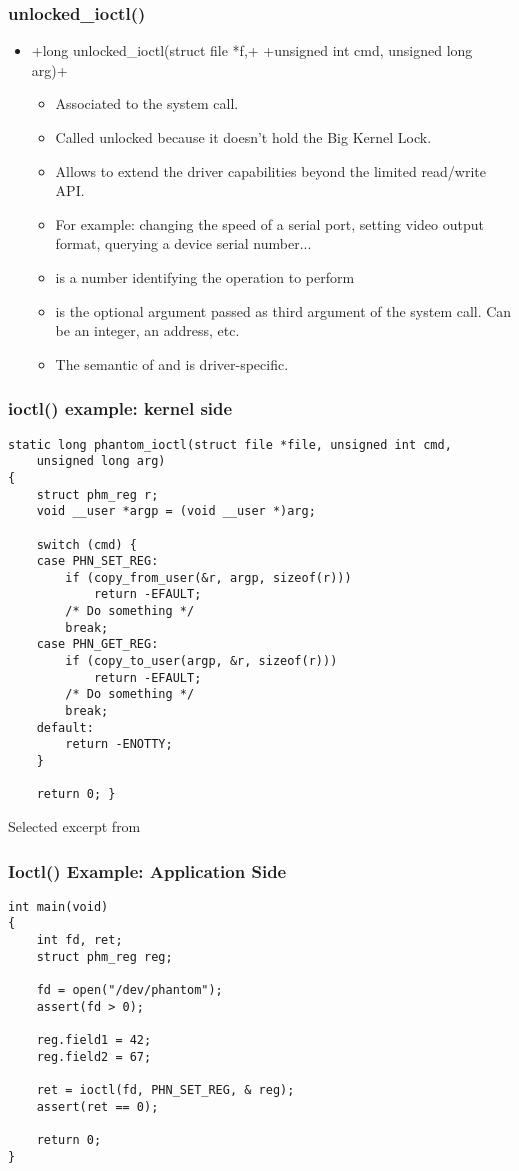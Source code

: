 \begin{frame}[fragile]
  \frametitle{unlocked\_ioctl()}
  \begin{itemize}
  \item {}+long unlocked_ioctl(struct file *f,+
    +unsigned int cmd, unsigned long arg)+
    \begin{itemize}
    \item Associated to the  system call.
    \item Called unlocked because it doesn't hold the Big Kernel Lock.
    \item Allows to extend the driver capabilities beyond the limited
      read/write API.
    \item For example: changing the speed of a serial port, setting
      video output format, querying a device serial number...
    \item {} is a number identifying the operation to perform
    \item {} is the optional argument passed as third argument
      of the  system call. Can be an integer, an
      address, etc.
    \item The semantic of  and  is
      driver-specific.
    \end{itemize}
  \end{itemize}
\end{frame}

\begin{frame}[fragile]
  \frametitle{ioctl() example: kernel side}
\begin{verbatim}
static long phantom_ioctl(struct file *file, unsigned int cmd,
    unsigned long arg)
{
    struct phm_reg r;
    void __user *argp = (void __user *)arg;

    switch (cmd) {
    case PHN_SET_REG:
        if (copy_from_user(&r, argp, sizeof(r)))
            return -EFAULT;
        /* Do something */
        break;
    case PHN_GET_REG:
        if (copy_to_user(argp, &r, sizeof(r)))
            return -EFAULT;
        /* Do something */
        break;
    default:
        return -ENOTTY;
    }

    return 0; }
\end{verbatim}
Selected excerpt from 
\end{frame}

\begin{frame}[fragile]
  \frametitle{Ioctl() Example: Application Side}
\begin{verbatim}
int main(void)
{
    int fd, ret;
    struct phm_reg reg;

    fd = open("/dev/phantom");
    assert(fd > 0);

    reg.field1 = 42;
    reg.field2 = 67;

    ret = ioctl(fd, PHN_SET_REG, & reg);
    assert(ret == 0);

    return 0;
}
\end{verbatim}
\end{frame}

